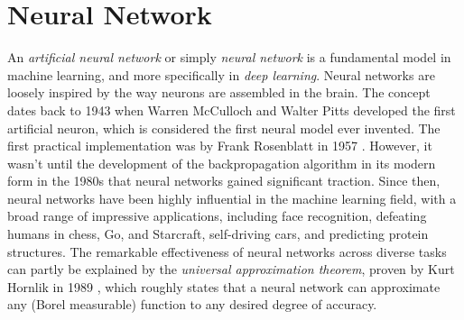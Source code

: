 \documentclass[../../thesis.tex]{subfiles}
\begin{document}








\section{Neural Network}
An \textit{artificial neural network} or simply \textit{neural network} is a fundamental model in machine learning, and more specifically in \textit{deep learning}. Neural networks are loosely inspired by the way neurons are assembled in the brain. The concept dates back to 1943 when Warren McCulloch and Walter Pitts developed the first artificial neuron, which is considered the first neural model ever invented\cite{MCCULLOCH199099}. The first practical implementation was by Frank Rosenblatt in 1957 \cite{rosenblatt1957perceptron}. However, it wasn't until the development of the backpropagation algorithm in its modern form in the 1980s that neural networks gained significant traction. Since then, neural networks have been highly influential in the machine learning field, with a broad range of impressive applications, including face recognition, defeating humans in chess, Go, and Starcraft, self-driving cars, and predicting protein structures.
The remarkable effectiveness of neural networks across diverse tasks can partly be explained by the \textit{universal approximation theorem}, proven by Kurt Hornlik in 1989 \cite{HORNIK1989359}, which roughly states that a neural network can approximate any (Borel measurable) function to any desired degree of accuracy. \newline
\end{document}
